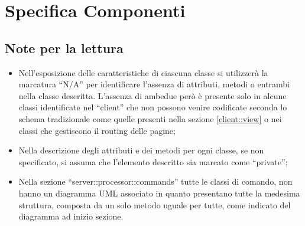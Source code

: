 %
%


\section{Specifica Componenti} %
\label{sec:specifica_componenti}

	\subsection{Note per la lettura} %
	\label{sub:note_specifica}
	\begin{itemize}
		\item Nell'esposizione delle caratteristiche di ciascuna classe si utilizzerà la marcatura ``N/A'' per identificare l'assenza di attributi, metodi o entrambi nella classe descritta. L'assenza di ambedue però è presente solo in alcune classi identificate nel ``client'' che non possono venire codificate seconda lo schema tradizionale come quelle presenti nella sezione \ref{client::view} o nei classi che gestiscono il routing delle pagine;
		\item Nella descrizione degli attributi e dei metodi per ogni classe, se non specificato, si assuma che l'elemento descritto sia marcato come ``private'';
		\item Nella sezione ``server::processor::commands'' tutte le classi di comando, non hanno un diagramma UML associato in quanto presentano tutte la medesima struttura, composta da un solo metodo uguale per tutte, come indicato del diagramma ad inizio sezione.
	\end{itemize}

	\clearpage \newpage
	 \clearpage \newpage
	 \clearpage \newpage
	 \clearpage \newpage

